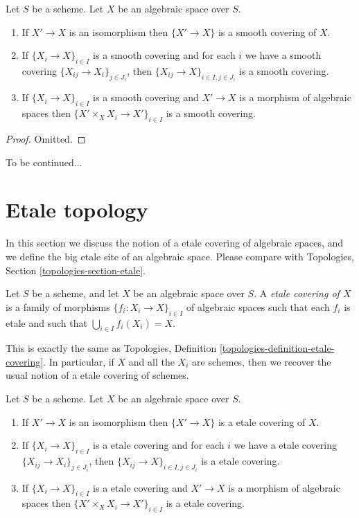 \begin{lemma}
\label{lemma-smooth}
Let $S$ be a scheme.
Let $X$ be an algebraic space over $S$.
\begin{enumerate}
\item If $X' \to X$ is an isomorphism then $\{X' \to X\}$
is a smooth covering of $X$.
\item If $\{X_i \to X\}_{i\in I}$ is a smooth covering and for each
$i$ we have a smooth covering $\{X_{ij} \to X_i\}_{j\in J_i}$, then
$\{X_{ij} \to X\}_{i \in I, j\in J_i}$ is a smooth covering.
\item If $\{X_i \to X\}_{i\in I}$ is a smooth covering
and $X' \to X$ is a morphism of algebraic spaces then
$\{X' \times_X X_i \to X'\}_{i\in I}$ is a smooth covering.
\end{enumerate}
\end{lemma}

\begin{proof}
Omitted.
\end{proof}

\noindent
To be continued...




\section{Etale topology}
\label{section-etale}

\noindent
In this section we discuss the notion of a etale covering of
algebraic spaces, and we define the big etale site of an
algebraic space. Please compare with
Topologies, Section \ref{topologies-section-etale}.

\begin{definition}
\label{definition-etale-covering}
Let $S$ be a scheme, and let $X$ be an algebraic space over $S$.
A {\it etale covering of $X$} is a family of morphisms
$\{f_i : X_i \to X\}_{i \in I}$ of algebraic spaces
such that each $f_i$ is etale
and such that $\bigcup_{i \in I} f_i(X_i) = X$.
\end{definition}

\noindent
This is exactly the same as
Topologies, Definition \ref{topologies-definition-etale-covering}.
In particular, if $X$ and all the $X_i$ are schemes, then we recover the
usual notion of a etale covering of schemes.

\begin{lemma}
\label{lemma-etale}
Let $S$ be a scheme.
Let $X$ be an algebraic space over $S$.
\begin{enumerate}
\item If $X' \to X$ is an isomorphism then $\{X' \to X\}$
is a etale covering of $X$.
\item If $\{X_i \to X\}_{i\in I}$ is a etale covering and for each
$i$ we have a etale covering $\{X_{ij} \to X_i\}_{j\in J_i}$, then
$\{X_{ij} \to X\}_{i \in I, j\in J_i}$ is a etale covering.
\item If $\{X_i \to X\}_{i\in I}$ is a etale covering
and $X' \to X$ is a morphism of algebraic spaces then
$\{X' \times_X X_i \to X'\}_{i\in I}$ is a etale covering.
\end{enumerate}
\end{lemma}

